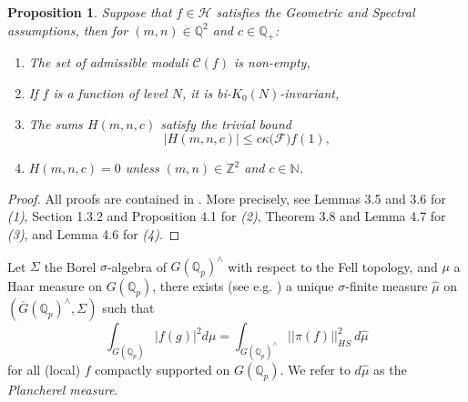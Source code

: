 \documentclass{article}
\newtheorem{proposition}[theorem]{Proposition}
\numberwithin{equation}{section}
\begin{document}
\begin{proposition}\label{prop:kloosterman-properties} Suppose that $f \in \mathcal{H}$ satisfies the Geometric and Spectral assumptions, then for $(m,n)\in \mathbb{Q}^2 $ and $c\in \mathbb{Q}_+$:
\begin{enumerate}[itemsep=0em, label=(\arabic*)]
    \item The set of admissible moduli $\mathcal{C}(f)$ is non-empty,
    \item If $f$ is a function of level $N$, it is bi-$K_0(N)$-invariant,
    \item The sums $H(m,n,c)$ satisfy the trivial bound
    \begin{equation}\label{eq:trivial-bound}
        |H(m,n,c)|\leq c\kappa(\mathcal{F)}f(1),
    \end{equation}
    \item $H(m,n,c)=0$ unless $(m,n)\in \mathbb{Z}^2$ and $c \in \mathbb{N}$.
\end{enumerate}
\end{proposition}
\begin{proof}
    All proofs are contained in \cite{generalised}. More precisely, see Lemmas 3.5 and 3.6 for \emph{(1)}, Section 1.3.2 and Proposition 4.1 for \emph{(2)}, Theorem 3.8 and Lemma 4.7 for \emph{(3)}, and Lemma 4.6 for \emph{(4)}.
\end{proof}

Let $\Sigma$ the Borel $\sigma$-algebra of $G(\mathbb{Q}_p)^{\wedge}$ with respect to the Fell topology, and $\mu$ a Haar measure on $G(\mathbb{Q}_p)$, there exists (see e.g. \cite[Chapter 18]{dixmier1969}) a unique $\sigma$-finite measure $\widehat{\mu}$ on $(\overline{G}(\mathbb{Q}_p)^{\wedge},\Sigma)$ such that
\begin{equation}
    \int_{{G}(\mathbb{Q}_p)}|f(g)|^2d\mu = \int_{{G}(\mathbb{Q}_p)^\wedge}||\pi(f)||_{HS}^2 \  d\widehat{\mu}
\end{equation}
for all (local) $f$ compactly supported on $G(\mathbb{Q}_p)$. We refer to $d\widehat{\mu}$ as the \emph{Plancherel measure}. \bigbreak 
\end{document}
